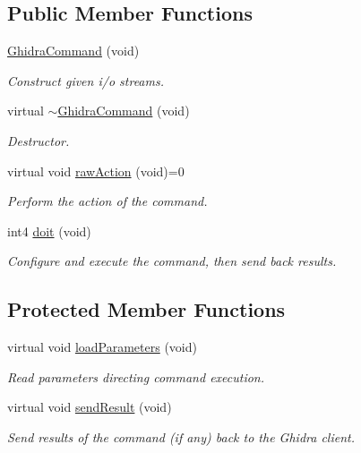 \subsection*{Public Member Functions}
\begin{DoxyCompactItemize}
\item 
\mbox{\hyperlink{class_ghidra_command_a41feaf5cd32bff29c0cac4eb30887ddc}{Ghidra\+Command}} (void)
\begin{DoxyCompactList}\small\item\em Construct given i/o streams. \end{DoxyCompactList}\item 
virtual \mbox{\hyperlink{class_ghidra_command_a7143317bf9787b98a77fd5b45316333c}{$\sim$\+Ghidra\+Command}} (void)
\begin{DoxyCompactList}\small\item\em Destructor. \end{DoxyCompactList}\item 
virtual void \mbox{\hyperlink{class_ghidra_command_a7d1a5cfedfd8f1d05161d27627302716}{raw\+Action}} (void)=0
\begin{DoxyCompactList}\small\item\em Perform the action of the command. \end{DoxyCompactList}\item 
int4 \mbox{\hyperlink{class_ghidra_command_a60d65958413c0e4669768332fa0f0476}{doit}} (void)
\begin{DoxyCompactList}\small\item\em Configure and execute the command, then send back results. \end{DoxyCompactList}\end{DoxyCompactItemize}
\subsection*{Protected Member Functions}
\begin{DoxyCompactItemize}
\item 
virtual void \mbox{\hyperlink{class_ghidra_command_a3e92d63544a9e5a36f27f6c3b177b28a}{load\+Parameters}} (void)
\begin{DoxyCompactList}\small\item\em Read parameters directing command execution. \end{DoxyCompactList}\item 
virtual void \mbox{\hyperlink{class_ghidra_command_a964ade9b1f768c55434d412834ba2eca}{send\+Result}} (void)
\begin{DoxyCompactList}\small\item\em Send results of the command (if any) back to the Ghidra client. \end{DoxyCompactList}\end{DoxyCompactItemize}
